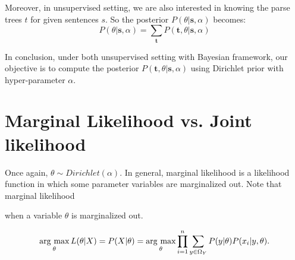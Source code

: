 \documentclass[11pt]{article}
\newcommand{\argmax}{\mathop{\rm arg~max}\limits}
\begin{document}
Moreover, in unsupervised setting, we are also interested in knowing the parse trees $t$ for given sentences $s$. So the posterior $P(\theta|\boldsymbol{s}, \alpha)$ becomes:
$$
P(\theta|\boldsymbol{s}, \alpha) = \sum_{\boldsymbol{t}} P(\boldsymbol{t}, \theta | \boldsymbol{s}, \alpha) 
$$

In conclusion, under both unsupervised setting with Bayesian framework, our objective is to compute the posterior $P(\boldsymbol{t}, \theta | \boldsymbol{s}, \alpha)$ using Dirichlet prior with hyper-parameter $\alpha$.

\section{Marginal Likelihood vs. Joint likelihood}

Once again, $\theta \sim Dirichlet(\alpha)$. 
In general, marginal likelihood is a likelihood function in which some parameter variables are marginalized out. Note that marginal likelihood


when a variable $\theta$ is marginalized out.

%
$$
\argmax_{\theta} L(\theta|X) = P(X|\theta) = \argmax_{\theta} \prod^n_{i = 1} \sum_{y \in \Omega_Y}P(y|\theta) P(x_i|y, \theta).
$$
%
%
\end{document}
